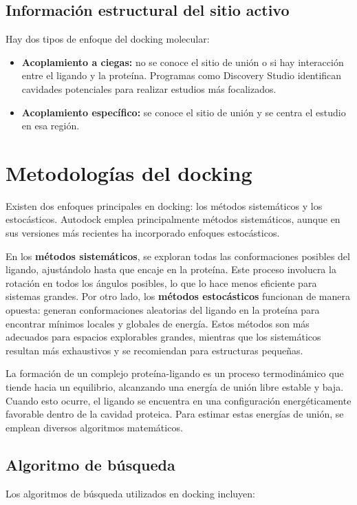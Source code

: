 \subsection{Información estructural del sitio activo}
Hay dos tipos de enfoque del docking molecular: 
\begin{itemize}
\item \textbf{Acoplamiento a ciegas:} no se conoce el sitio de unión o si hay interacción entre el ligando y la proteína. Programas como Discovery Studio identifican cavidades potenciales para realizar estudios más focalizados.
\item \textbf{Acoplamiento específico:} se conoce el sitio de unión y se centra el estudio en esa región.
\end{itemize}

\section{Metodologías del docking}
Existen dos enfoques principales en docking: los métodos sistemáticos y los estocásticos. Autodock emplea principalmente métodos sistemáticos, aunque en sus versiones más recientes ha incorporado enfoques estocásticos.

En los \textbf{métodos sistemáticos}, se exploran todas las conformaciones posibles del ligando, ajustándolo hasta que encaje en la proteína. Este proceso involucra la rotación en todos los ángulos posibles, lo que lo hace menos eficiente para sistemas grandes. Por otro lado, los \textbf{métodos estocásticos} funcionan de manera opuesta: generan conformaciones aleatorias del ligando en la proteína para encontrar mínimos locales y globales de energía. Estos métodos son más adecuados para espacios explorables grandes, mientras que los sistemáticos resultan más exhaustivos y se recomiendan para estructuras pequeñas.

La formación de un complejo proteína-ligando es un proceso termodinámico que tiende hacia un equilibrio, alcanzando una energía de unión libre estable y baja. Cuando esto ocurre, el ligando se encuentra en una configuración energéticamente favorable dentro de la cavidad proteica. Para estimar estas energías de unión, se emplean diversos algoritmos matemáticos.

\subsection{Algoritmo de búsqueda}
Los algoritmos de búsqueda utilizados en docking incluyen:

